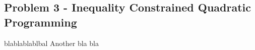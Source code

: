 \subsection{Problem 3 - Inequality Constrained Quadratic Programming}
blablablablbal
Another bla bla